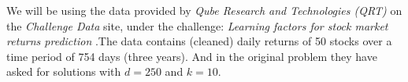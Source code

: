 We will be using the data provided by \textit{Qube Research and Technologies (QRT)} on the \textit{Challenge Data} site, under the challenge: \textit{Learning factors for stock market returns prediction} \cite{qrt_challenge}.\newline The data contains (cleaned) daily returns of 50 stocks over a time period of 754 days (three years). And in the original problem they have asked for solutions with $d=250$ and $k=10$.

